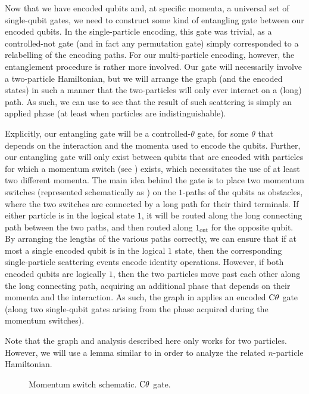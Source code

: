 \documentclass[../thesis-main/thesis-main]{subfiles}
\begin{document}
Now that we have encoded qubits and, at specific momenta, a universal set of single-qubit gates, we need to construct some kind of entangling gate between our encoded qubits.  In the single-particle encoding, this gate was trivial, as a controlled-not gate (and in fact any permutation gate) simply corresponded to a relabelling of the encoding paths.  For our multi-particle encoding, however, the entanglement procedure is rather more involved.  Our gate will necessarily involve a two-particle Hamiltonian, but we will arrange the graph (and the encoded states) in such a manner that the two-particles will only ever interact on a (long) path.  As such, we can use  to see that the result of such scattering is simply an applied phase (at least when particles are indistinguishable).

Explicitly, our entangling gate will be a controlled-$\theta$ gate, for some $\theta$ that depends on the interaction and the momenta used to encode the qubits.  Further, our entangling gate will only exist between qubits that are encoded with particles for which a momentum switch (see ) exists, which necessitates the use of at least two different momenta.  The main idea behind the gate is to place two momentum switches (represented schematically as ) on the $1$-paths of the qubits as obstacles, where the two switches are connected by a long path for their third terminals.  If either particle is in the logical state $1$, it will be routed along the long connecting path between the two paths, and then routed along $1_{\text{out}}$ for the opposite qubit.  By arranging the lengths of the various paths correctly, we can ensure that if at most a single encoded qubit is in the logical $1$ state, then the corresponding single-particle scattering events encode identity operations.  However, if both encoded qubits are logically $1$, then the two particles move past each other along the long connecting path, acquiring an additional phase that depends on their momenta and the interaction.  As such, the graph in  applies an encoded $\CD$ gate (along two single-qubit gates arising from the phase acquired during the momentum switches).

Note that the graph and analysis described here only works for two particles.  However, we will use a lemma similar to  in order to analyze the related $n$-particle Hamiltonian.

\begin{figure}
\centering
{}
\hspace{0.5cm}
\caption[MPQW $\CD$ gate]{ Momentum switch schematic.  $\CD$ gate.}
\label{fig:onepsplit}
\end{figure}
\end{document}
